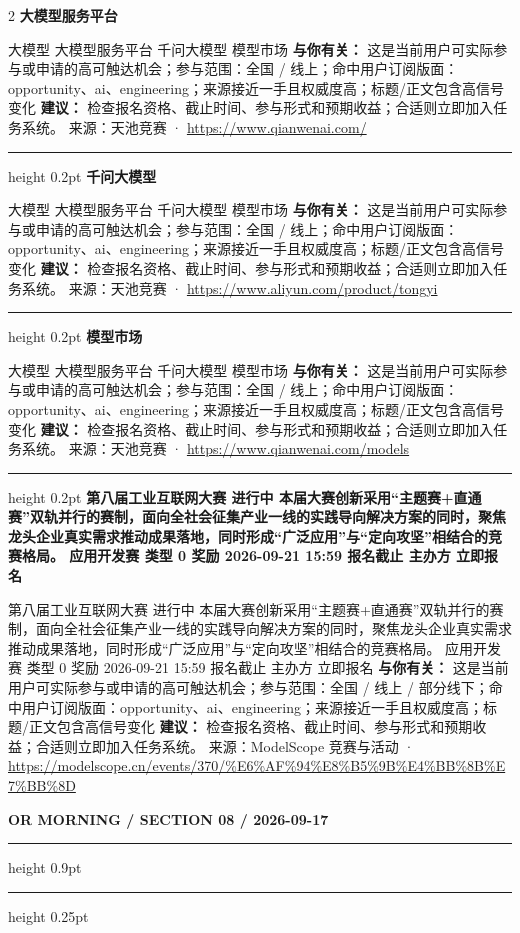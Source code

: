 \documentclass[10.5pt]{ctexart}
\begin{document}
\begin{multicols}{2}
{\large\bfseries 大模型服务平台}\par
大模型 大模型服务平台 千问大模型 模型市场
\textbf{与你有关：} 这是当前用户可实际参与或申请的高可触达机会；参与范围：全国 / 线上；命中用户订阅版面：opportunity、ai、engineering；来源接近一手且权威度高；标题/正文包含高信号变化
\textbf{建议：} 检查报名资格、截止时间、参与形式和预期收益；合适则立即加入任务系统。
{\footnotesize\color{ormuted} 来源：天池竞赛 · \url{https://www.qianwenai.com/}}
\vspace{2mm}
\hrule height 0.2pt
\vspace{2mm}
{\large\bfseries 千问大模型}\par
大模型 大模型服务平台 千问大模型 模型市场
\textbf{与你有关：} 这是当前用户可实际参与或申请的高可触达机会；参与范围：全国 / 线上；命中用户订阅版面：opportunity、ai、engineering；来源接近一手且权威度高；标题/正文包含高信号变化
\textbf{建议：} 检查报名资格、截止时间、参与形式和预期收益；合适则立即加入任务系统。
{\footnotesize\color{ormuted} 来源：天池竞赛 · \url{https://www.aliyun.com/product/tongyi}}
\vspace{2mm}
\hrule height 0.2pt
\vspace{2mm}
{\large\bfseries 模型市场}\par
大模型 大模型服务平台 千问大模型 模型市场
\textbf{与你有关：} 这是当前用户可实际参与或申请的高可触达机会；参与范围：全国 / 线上；命中用户订阅版面：opportunity、ai、engineering；来源接近一手且权威度高；标题/正文包含高信号变化
\textbf{建议：} 检查报名资格、截止时间、参与形式和预期收益；合适则立即加入任务系统。
{\footnotesize\color{ormuted} 来源：天池竞赛 · \url{https://www.qianwenai.com/models}}
\vspace{2mm}
\hrule height 0.2pt
\vspace{2mm}
{\large\bfseries 第八届工业互联网大赛 进行中 本届大赛创新采用“主题赛+直通赛”双轨并行的赛制，面向全社会征集产业一线的实践导向解决方案的同时，聚焦龙头企业真实需求推动成果落地，同时形成“广泛应用”与“定向攻坚”相结合的竞赛格局。 应用开发赛 类型 0 奖励 2026-09-21 15:59 报名截止 主办方 立即报名}\par
第八届工业互联网大赛 进行中 本届大赛创新采用“主题赛+直通赛”双轨并行的赛制，面向全社会征集产业一线的实践导向解决方案的同时，聚焦龙头企业真实需求推动成果落地，同时形成“广泛应用”与“定向攻坚”相结合的竞赛格局。 应用开发赛 类型 0 奖励 2026-09-21 15:59 报名截止 主办方 立即报名
\textbf{与你有关：} 这是当前用户可实际参与或申请的高可触达机会；参与范围：全国 / 线上 / 部分线下；命中用户订阅版面：opportunity、ai、engineering；来源接近一手且权威度高；标题/正文包含高信号变化
\textbf{建议：} 检查报名资格、截止时间、参与形式和预期收益；合适则立即加入任务系统。
{\footnotesize\color{ormuted} 来源：ModelScope 竞赛与活动 · \url{https://modelscope.cn/events/370/%E6%AF%94%E8%B5%9B%E4%BB%8B%E7%BB%8D}}
\end{multicols}
\newpage
{\small\bfseries OR MORNING / SECTION 08 / 2026-09-17}
\vspace{2mm}
\hrule height 0.9pt
\vspace{1.5mm}
\hrule height 0.25pt
\vspace{4mm}
\end{document}
